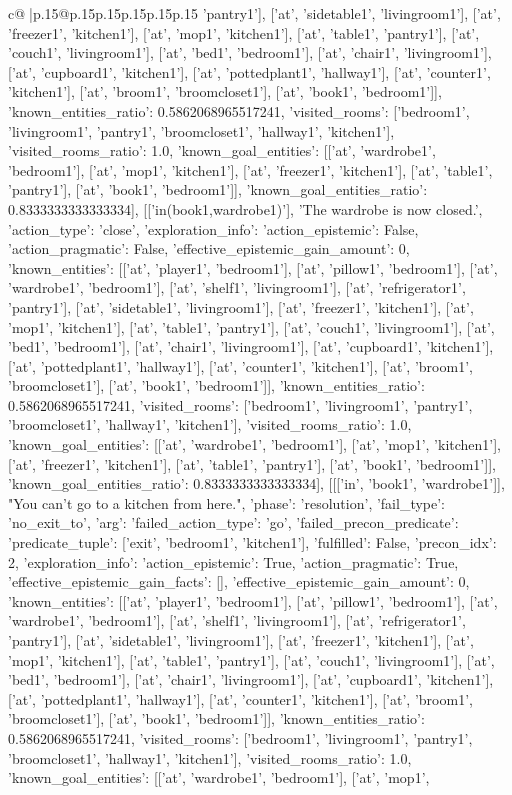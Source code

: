 \documentclass{article}
\begin{document}
{\begin{supertabular}{c@{$\;$}|p{.15\linewidth}@{}p{.15\linewidth}p{.15\linewidth}p{.15\linewidth}p{.15\linewidth}p{.15\linewidth}}
{{{'pantry1'], ['at', 'sidetable1', 'livingroom1'], ['at', 'freezer1', 'kitchen1'], ['at', 'mop1', 'kitchen1'], ['at', 'table1', 'pantry1'], ['at', 'couch1', 'livingroom1'], ['at', 'bed1', 'bedroom1'], ['at', 'chair1', 'livingroom1'], ['at', 'cupboard1', 'kitchen1'], ['at', 'pottedplant1', 'hallway1'], ['at', 'counter1', 'kitchen1'], ['at', 'broom1', 'broomcloset1'], ['at', 'book1', 'bedroom1']], 'known_entities_ratio': 0.5862068965517241, 'visited_rooms': ['bedroom1', 'livingroom1', 'pantry1', 'broomcloset1', 'hallway1', 'kitchen1'], 'visited_rooms_ratio': 1.0, 'known_goal_entities': [['at', 'wardrobe1', 'bedroom1'], ['at', 'mop1', 'kitchen1'], ['at', 'freezer1', 'kitchen1'], ['at', 'table1', 'pantry1'], ['at', 'book1', 'bedroom1']], 'known_goal_entities_ratio': 0.8333333333333334}}], [['in(book1,wardrobe1)'], 'The wardrobe is now closed.', {'action_type': 'close', 'exploration_info': {'action_epistemic': False, 'action_pragmatic': False, 'effective_epistemic_gain_amount': 0, 'known_entities': [['at', 'player1', 'bedroom1'], ['at', 'pillow1', 'bedroom1'], ['at', 'wardrobe1', 'bedroom1'], ['at', 'shelf1', 'livingroom1'], ['at', 'refrigerator1', 'pantry1'], ['at', 'sidetable1', 'livingroom1'], ['at', 'freezer1', 'kitchen1'], ['at', 'mop1', 'kitchen1'], ['at', 'table1', 'pantry1'], ['at', 'couch1', 'livingroom1'], ['at', 'bed1', 'bedroom1'], ['at', 'chair1', 'livingroom1'], ['at', 'cupboard1', 'kitchen1'], ['at', 'pottedplant1', 'hallway1'], ['at', 'counter1', 'kitchen1'], ['at', 'broom1', 'broomcloset1'], ['at', 'book1', 'bedroom1']], 'known_entities_ratio': 0.5862068965517241, 'visited_rooms': ['bedroom1', 'livingroom1', 'pantry1', 'broomcloset1', 'hallway1', 'kitchen1'], 'visited_rooms_ratio': 1.0, 'known_goal_entities': [['at', 'wardrobe1', 'bedroom1'], ['at', 'mop1', 'kitchen1'], ['at', 'freezer1', 'kitchen1'], ['at', 'table1', 'pantry1'], ['at', 'book1', 'bedroom1']], 'known_goal_entities_ratio': 0.8333333333333334}}], [[['in', 'book1', 'wardrobe1']], "You can't go to a kitchen from here.", {'phase': 'resolution', 'fail_type': 'no_exit_to', 'arg': {'failed_action_type': 'go', 'failed_precon_predicate': {'predicate_tuple': ['exit', 'bedroom1', 'kitchen1'], 'fulfilled': False, 'precon_idx': 2}}, 'exploration_info': {'action_epistemic': True, 'action_pragmatic': True, 'effective_epistemic_gain_facts': [], 'effective_epistemic_gain_amount': 0, 'known_entities': [['at', 'player1', 'bedroom1'], ['at', 'pillow1', 'bedroom1'], ['at', 'wardrobe1', 'bedroom1'], ['at', 'shelf1', 'livingroom1'], ['at', 'refrigerator1', 'pantry1'], ['at', 'sidetable1', 'livingroom1'], ['at', 'freezer1', 'kitchen1'], ['at', 'mop1', 'kitchen1'], ['at', 'table1', 'pantry1'], ['at', 'couch1', 'livingroom1'], ['at', 'bed1', 'bedroom1'], ['at', 'chair1', 'livingroom1'], ['at', 'cupboard1', 'kitchen1'], ['at', 'pottedplant1', 'hallway1'], ['at', 'counter1', 'kitchen1'], ['at', 'broom1', 'broomcloset1'], ['at', 'book1', 'bedroom1']], 'known_entities_ratio': 0.5862068965517241, 'visited_rooms': ['bedroom1', 'livingroom1', 'pantry1', 'broomcloset1', 'hallway1', 'kitchen1'], 'visited_rooms_ratio': 1.0, 'known_goal_entities': [['at', 'wardrobe1', 'bedroom1'], ['at', 'mop1', }}}
\end{supertabular}}
\end{document}
